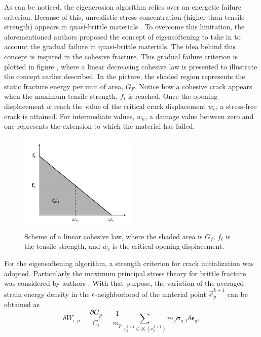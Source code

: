 \message{ !name(2020_EFM_MPM_Eigensoftening.tex)}\documentclass[preprint,12pt,a4paper]{elsarticle}
\newcommand{\tens}[1]{
  \ensuremath{\mathbf{{#1}}}
}
\begin{document}
As can be noticed, the eigenerosion algorithm relies over an energetic
failure criterion. Because of this, unrealistic stress
concentration (higher than tensile strength) appears in quasi-brittle
materials \cite{Navas_2017_ES}. To overcome this limitation, the
aforementioned authors proposed the concept of eigensoftening to take
in to account the gradual failure in quasi-brittle materials. The idea
behind this concept is inspired in the cohesive fracture. This gradual
failure criterion is plotted in figure \label{fig:Damage-ft-wc}, where
a linear decreasing cohesive law is presented to illustrate the
concept earlier described. In the picture, the shaded region represents
the static fracture energy per unit of area, $G_F$. Notice how a
cohesive crack appears when the maximum tensile strength, $f_t$ is
reached. Once the opening displacement $w$ reach the value of the
critical crack displacement $w_c$, a stress-free crack is
attained. For intermediate values, $w_n$, a damage value between zero
and one represents the extension to which the material has failed.
\begin{figure}
  \centering
  \includegraphics[width=0.5\textwidth]{Figure-Damage}
  \caption{Scheme of a linear cohesive law, where the shaded area is
    $G_f$, $f_t$ is the tensile strength, and $w_c$ is the critical
    opening displacement.}
  \label{fig:Damage-ft-wc}
\end{figure}
For the eigensoftening algorithm, a strength criterion for crack
initialization was adopted. Particularly the maximum principal stress
theory for brittle fracture was considered by authors
\cite{Navas_2017_ES}. With that purpose, the variation of the averaged
strain energy density in the $\epsilon$-neighborhood of the material point
$\vec{x}_p^{k+1}$ can be obtained as
\begin{equation}
  \label{eq:variation-averaged-strain-energy-density}
  \delta W_{\epsilon,p} = \frac{\partial G_p}{C_{\epsilon}} =
  \frac{1}{m_p} \sum_{x_q^{k+1} \in
  B_{\epsilon}(x_p^{k+1})} m_q \tens{\sigma}_{q,I} \delta \tens{\epsilon}_q,
\end{equation}
\end{document}
